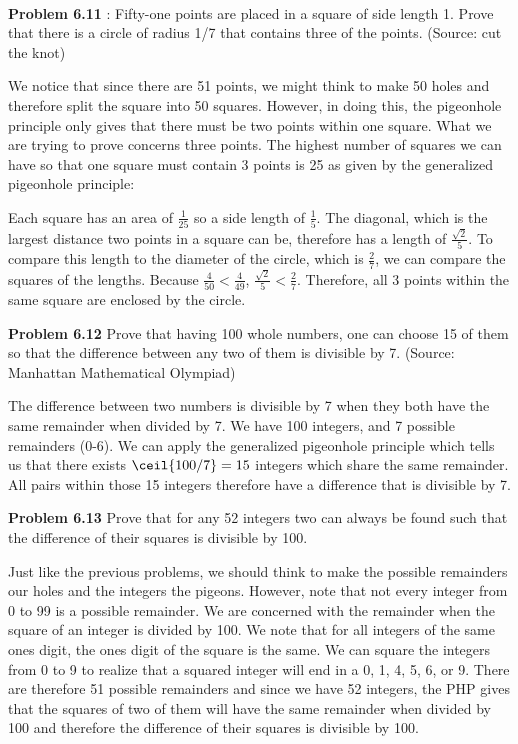 \documentclass[11pt]{scrartcl}
\DeclarePairedDelimiter
\begin{document}
\\
\begin{tcolorbox}
\textbf{Problem 6.11} : Fifty-one points are placed in a square of side length 1. Prove that there is a circle
of radius 1/7 that contains three of the points. (Source: cut the knot)
\end{tcolorbox}
\noindent 
We notice that since there are 51 points, we might think to make 50 holes and therefore split the square into 50 squares. However, in doing this, the pigeonhole principle only gives that there must be two points within one square. What we are trying to prove concerns three points. The highest number of squares we can have so that one square must contain 3 points is 25 as given by the generalized pigeonhole principle: 

Each square has an area of $\frac{1}{25}$ so a side length of $\frac{1}{5}$. The diagonal, which is the largest distance two points in a square can be, therefore has a length of $\frac{\sqrt{2}}{5}$. To compare this length to the diameter of the circle, which is $\frac{2}{7}$, we can compare the squares of the lengths. Because $\frac{4}{50}<\frac{4}{49}$, $\frac{\sqrt{2}}{5}<\frac{2}{7}$. Therefore, all 3 points within the same square are enclosed by the circle. 
\begin{tcolorbox}
\textbf{Problem 6.12} Prove that having 100 whole numbers, one can choose 15 of them so that the difference between any two of them is divisible by 7. (Source: Manhattan Mathematical Olympiad)
\end{tcolorbox}
The difference between two numbers is divisible by 7 when they both have the same remainder when divided by 7. We have 100 integers, and 7 possible remainders (0-6). We can apply the generalized pigeonhole principle which tells us that there exists $\ceil{100/7}=15$ integers which share the same remainder. All pairs within those 15 integers therefore have a difference that is divisible by 7.  
\\
\begin{tcolorbox}
\textbf{Problem 6.13} Prove that for any 52 integers two can always be found such that the difference of their squares is divisible by 100.
\end{tcolorbox}
\noindent 
Just like the previous problems, we should think to make the possible remainders our holes and the integers the pigeons. However, note that not every integer from 0 to 99 is a possible remainder. We are concerned with the remainder when the square of an integer is divided by 100. We note that for all integers of the same ones digit, the ones digit of the square is the same. We can square the integers from 0 to 9 to realize that a squared integer will end in a 0, 1, 4, 5, 6, or 9. There are therefore 51 possible remainders and since we have 52 integers, the PHP gives that the squares of two of them will have the same remainder when divided by 100 and therefore the difference of their squares is divisible by 100. 
\end{document}
